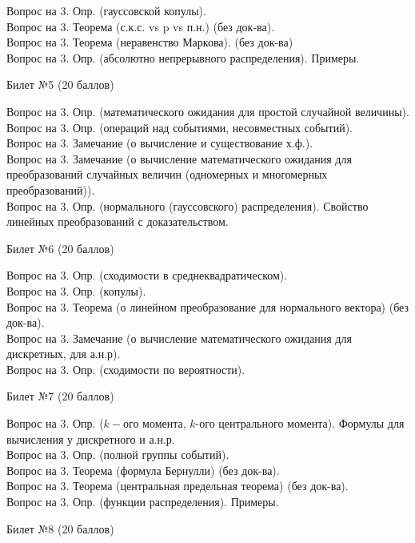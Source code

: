 \documentclass[preview]{standalone}
\begin{document}
Вопрос на 3. Опр. (гауссовской копулы). \\
Вопрос на 3.  Теорема (с.к.с. vs p vs п.н.) (без док-ва). \\ 
Вопрос на 3. Теорема (неравенство Маркова). (без док-ва) \\
Вопрос на 3. Опр. (абсолютно непрерывного распределения). Примеры. \\
\begin{center} {\Large Билет №5 (20 баллов)} \end{center}
Вопрос на 3.  Опр. (математического ожидания для простой случайной величины). \\
Вопрос на 3.  Опр. (операций над событиями, несовместных событий). \\
Вопрос на 3.  Замечание (о вычисление и существование х.ф.). \\
Вопрос на 3.  Замечание (о вычисление  математического ожидания для преобразований случайных величин (одномерных и многомерных преобразований)). \\
Вопрос на 3.  Опр. (нормального (гауссовского) распределения). Свойство линейных преобразований с доказательством. \\
\begin{center} {\Large Билет №6 (20 баллов)} \end{center}
Вопрос на 3.  Опр. (сходимости в среднеквадратическом). \\
Вопрос на 3. Опр. (копулы). \\
Вопрос на 3. Теорема (о линейном преобразование для нормального вектора) (без док-ва). \\
Вопрос на 3.  Замечание (о вычисление  математического ожидания для дискретных, для а.н.р). \\
Вопрос на 3. Опр. (сходимости по вероятности). \\
\begin{center} {\Large Билет №7 (20 баллов)} \end{center}
Вопрос на 3. Опр. ($k-$ого момента, $k$-ого центрального момента). Формулы для вычисления у дискретного и а.н.р. \\
Вопрос на 3.  Опр. (полной группы событий). \\
Вопрос на 3.  Теорема (формула Бернулли) (без док-ва). \\
Вопрос на 3. Теорема (центральная предельная теорема) (без док-ва). \\
Вопрос на 3.  Опр. (функции распределения). Примеры. \\
\begin{center} {\Large Билет №8 (20 баллов)} \end{center}
\end{document}
